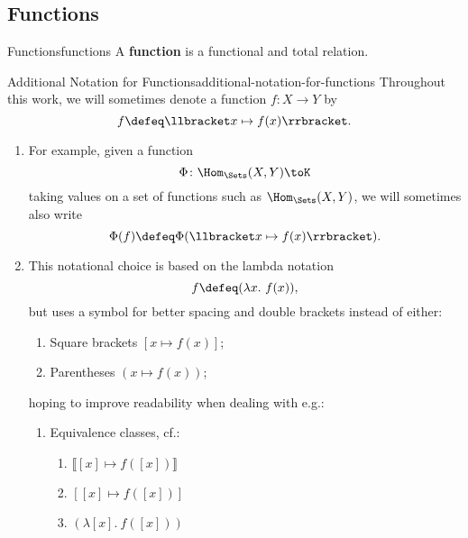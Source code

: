 \subsection{Functions}\label{subsection-sets-and-functions-functions}
\begin{definition}{Functions}{functions}%
    A \textbf{function} is a functional and total relation.
\end{definition}
\begin{notation}{Additional Notation for Functions}{additional-notation-for-functions}%
    Throughout this work, we will sometimes denote a function $f\colon X\to Y$ by
    \[
        f%
        \defeq%
        \llbracket x\mapsto f(x)\rrbracket.%
    \]%
    \begin{enumerate}
        \item For example, given a function%
            \[
                \Phi%
                \colon%
                \Hom_{\Sets}(X,Y)%
                \to%
                K%
            \]%
            taking values on a set of functions such as $\Hom_{\Sets}(X,Y)$, we will sometimes also write
            \[
                \Phi(f)%
                \defeq%
                \Phi(\llbracket x\mapsto f(x)\rrbracket).%
            \]%
        \item This notational choice is based on the lambda notation
            \[
                f%
                \defeq%
                (\lambda x.\ f(x)),%
            \]%
            but uses a \say{$\mathord{\mapsto}$} symbol for better spacing and double brackets instead of either:
            \begin{enumerate}
                \item Square brackets $[x\mapsto f(x)]$;
                \item Parentheses $(x\mapsto f(x))$;
            \end{enumerate}
            hoping to improve readability when dealing with e.g.:
            \begin{enumerate}
                \item Equivalence classes, cf.:
                    \begin{enumerate}
                        \item $\llbracket[x]\mapsto f([x])\rrbracket$%
                        \item $[[x]\mapsto f([x])]$%
                        \item $(\lambda[x].\ f([x]))$%
                    \end{enumerate}

\end{enumerate}
\end{enumerate}
\end{notation}
